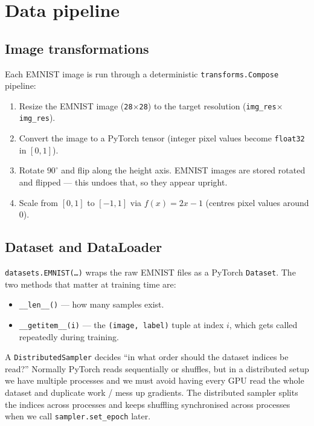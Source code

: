 \documentclass[11pt]{article}
\newcommand{\code}[1]{\texttt{#1}}
\begin{document}
\section{Data pipeline}

\subsection{Image transformations}

Each EMNIST image is run through a deterministic \code{transforms.Compose}
pipeline:

\begin{enumerate}[leftmargin=*]
  \item Resize the EMNIST image (\code{28$\times$28}) to the target
        resolution (\code{img\_res$\times$img\_res}).
  \item Convert the image to a PyTorch tensor (integer pixel values become
        \code{float32} in $[0,1]$).
  \item Rotate $90^\circ$ and flip along the height axis. EMNIST images are
        stored rotated and flipped --- this undoes that, so they appear upright.
  \item Scale from $[0,1]$ to $[-1,1]$ via $f(x)=2x-1$ (centres pixel values
        around $0$).
\end{enumerate}

\subsection{Dataset and DataLoader}

\code{datasets.EMNIST(\dots)} wraps the raw EMNIST files as a PyTorch
\code{Dataset}. The two methods that matter at training time are:
\begin{itemize}
  \item \code{\_\_len\_\_()} --- how many samples exist.
  \item \code{\_\_getitem\_\_(i)} --- the \code{(image, label)} tuple at
        index $i$, which gets called repeatedly during training.
\end{itemize}

A \code{DistributedSampler} decides ``in what order should the dataset
indices be read?'' Normally PyTorch reads sequentially or shuffles, but in a
distributed setup we have multiple processes and we must avoid having every
GPU read the whole dataset and duplicate work / mess up gradients. The
distributed sampler splits the indices across processes and keeps shuffling
synchronised across processes when we call \code{sampler.set\_epoch} later.
\end{document}
